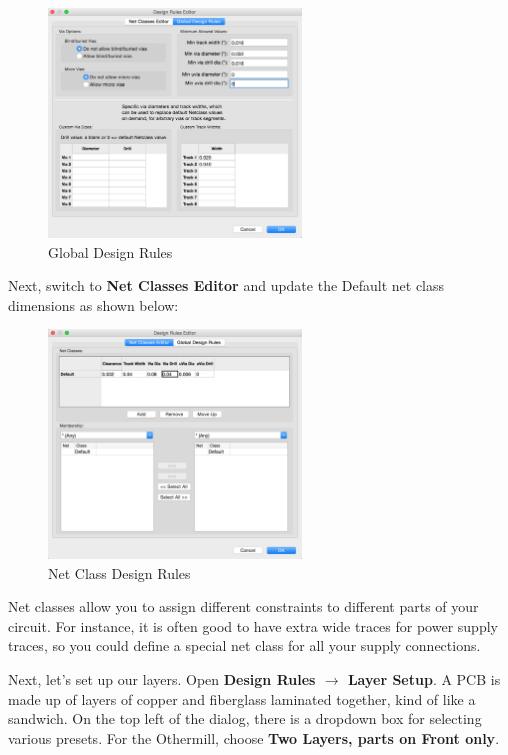 \documentclass[12pt, oneside]{article}
\begin{document}
\begin{figure}[H]
\includegraphics[width=0.6\textwidth]{GlobalDesignRules}
\centering
\caption{Global Design Rules}
\end{figure}

Next, switch to \textbf{Net Classes Editor} and update the Default net class dimensions as shown below:

\begin{figure}[H]
\includegraphics[width=0.6\textwidth]{NetClassRules}
\centering
\caption{Net Class Design Rules}
\end{figure}

Net classes allow you to assign different constraints to different parts of your circuit. For instance, it is often good to have extra wide traces for power supply traces, so you could define a special net class for all your supply connections.

Next, let's set up our layers. Open \textbf{Design Rules $\rightarrow$ Layer Setup}. A PCB is made up of layers of copper and fiberglass laminated together, kind of like a sandwich. On the top left of the dialog, there is a dropdown box for selecting various presets. For the Othermill, choose \textbf{Two Layers, parts on Front only}. 
\end{document}
